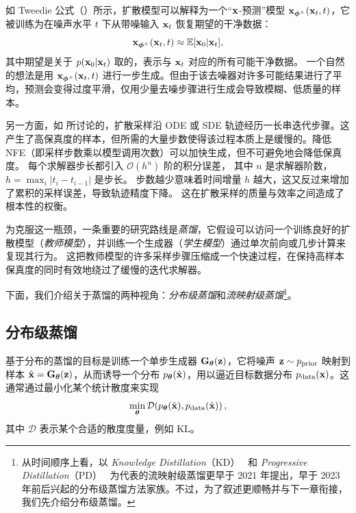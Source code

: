 如 Tweedie 公式（）所示，扩散模型可以解释为一个“${\mathbf{x}}$-预测”模型 ${\mathbf{x}}_{\bm{\phi}^\times}({\mathbf{x}}_t, t)$，它被训练为在噪声水平 $t$ 下从带噪输入 ${\mathbf{x}}_t$ 恢复期望的干净数据：
\[
    {\mathbf{x}}_{\bm{\phi}^\times}({\mathbf{x}}_t, t) \approx \mathbb{E}[{\mathbf{x}}_0 |{\mathbf{x}}_t],
\]
其中期望是关于 $p({\mathbf{x}}_0 |{\mathbf{x}}_t)$ 取的，表示与 ${\mathbf{x}}_t$ 对应的所有可能干净数据。
一个自然的想法是用 ${\mathbf{x}}_{\bm{\phi}^\times}({\mathbf{x}}_t, t)$ 进行一步生成。但由于该去噪器对许多可能结果进行了平均，预测会变得过度平滑，仅用少量去噪步骤进行生成会导致模糊、低质量的样本。

另一方面，如  所讨论的，扩散采样沿 ODE 或 SDE 轨迹经历一长串迭代步骤。这产生了高保真度的样本，但所需的大量步数使得该过程本质上是缓慢的。降低 NFE（即采样步数乘以模型调用次数）可以加快生成，但不可避免地会降低保真度。
每个求解器步长都引入 $\mathcal{O}(h^{n})$ 阶的积分误差，
其中 $n$ 是求解器阶数，$h=\max_i |t_i - t_{i-1}|$ 是步长。
步数越少意味着时间增量 $h$ 越大，这又反过来增加了累积的采样误差，导致轨迹精度下降。
这在扩散采样的质量与效率之间造成了根本性的权衡。

为克服这一瓶颈，一条重要的研究路线是\emph{蒸馏}，它假设可以访问一个训练良好的扩散模型（\emph{教师模型}），并训练一个生成器（\emph{学生模型}）通过单次前向或几步计算来复现其行为。
这把教师模型的许多采样步骤压缩成一个快速过程，在保持高样本保真度的同时有效地绕过了缓慢的迭代求解器。




下面，我们介绍关于蒸馏的两种视角：\emph{分布级蒸馏}和\emph{流映射级蒸馏}\footnote{从时间顺序上看，以 \emph{Knowledge Distillation}（KD）~\citep{luhman2021knowledge} 和 \emph{Progressive Distillation}（PD）~\citep{ho2020denoising} 为代表的流映射级蒸馏更早于 2021 年提出，早于 2023 年前后兴起的分布级蒸馏方法家族。不过，为了叙述更顺畅并与下一章衔接，我们先介绍分布级蒸馏。}。




\subsection{分布级蒸馏}
基于分布的蒸馏的目标是训练一个单步生成器 ${\mathbf{G}}_{\bm{\theta}}({\mathbf{z}})$，它将噪声 ${\mathbf{z}} \sim p_{\mathrm{prior}}$ 映射到样本 $\hat{{\mathbf{x}}} = {\mathbf{G}}_{\bm{\theta}}({\mathbf{z}})$，从而诱导一个分布 $p_{\bm{\theta}}(\hat{{\mathbf{x}}})$，用以逼近目标数据分布 $p_{\mathrm{data}}({\mathbf{x}})$。这通常通过最小化某个统计散度来实现
\[
\min_{\bm{\theta}}  \mathcal{D}\!\left(p_{\bm{\theta}}(\hat{{\mathbf{x}}}),  p_{\mathrm{data}}(\hat{{\mathbf{x}}})\right),
\]
其中 $\mathcal{D}$ 表示某个合适的散度度量，例如 KL。

